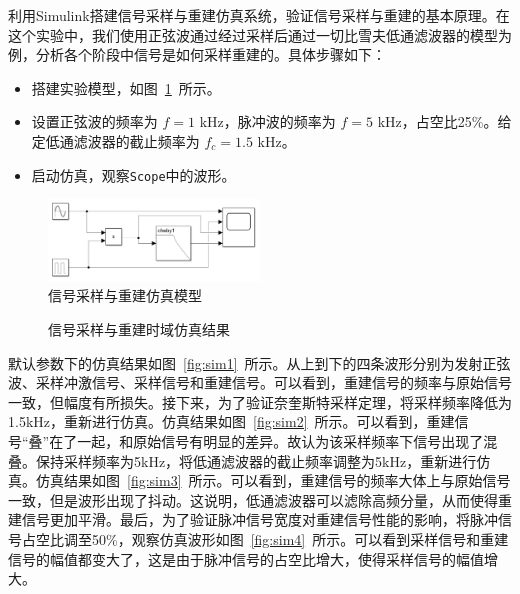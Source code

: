 \documentclass[lang=cn,newtx,10pt,scheme=chinese]{elegantbook}
\begin{document}
利用Simulink搭建信号采样与重建仿真系统，验证信号采样与重建的基本原理。在这个实验中，我们使用正弦波通过经过采样后通过一切比雪夫低通滤波器的模型为例，分析各个阶段中信号是如何采样重建的。具体步骤如下：
\begin{itemize}
  \item 搭建实验模型，如图~\ref{fig:model1}~所示。
  \item 设置正弦波的频率为 $f = 1$ kHz，脉冲波的频率为 $f = 5$ kHz，占空比25\%。给定低通滤波器的截止频率为 $f_c = 1.5$ kHz。
  \item 启动仿真，观察\lstinline{Scope}中的波形。
\end{itemize}
\begin{figure}[htbp]
  \centering
  \includegraphics[width=0.5\textwidth]{figure/model1.png}
  \caption{信号采样与重建仿真模型}
  \label{fig:model1}
\end{figure}

\begin{figure}[htbp]
  \centering
  \hfill
  \newline
  \hfill
  \caption{信号采样与重建时域仿真结果}
  \label{fig:sim}
\end{figure}

默认参数下的仿真结果如图~\ref{fig:sim1}~所示。从上到下的四条波形分别为发射正弦波、采样冲激信号、采样信号和重建信号。可以看到，重建信号的频率与原始信号一致，但幅度有所损失。接下来，为了验证奈奎斯特采样定理，将采样频率降低为1.5kHz，重新进行仿真。仿真结果如图~\ref{fig:sim2}~所示。可以看到，重建信号“叠”在了一起，和原始信号有明显的差异。故认为该采样频率下信号出现了混叠。保持采样频率为5kHz，将低通滤波器的截止频率调整为5kHz，重新进行仿真。仿真结果如图~\ref{fig:sim3}~所示。可以看到，重建信号的频率大体上与原始信号一致，但是波形出现了抖动。这说明，低通滤波器可以滤除高频分量，从而使得重建信号更加平滑。最后，为了验证脉冲信号宽度对重建信号性能的影响，将脉冲信号占空比调至50\%，观察仿真波形如图~\ref{fig:sim4}~所示。可以看到采样信号和重建信号的幅值都变大了，这是由于脉冲信号的占空比增大，使得采样信号的幅值增大。
\end{document}
